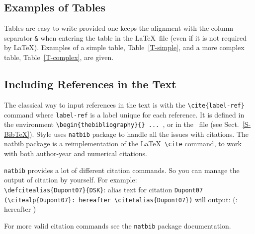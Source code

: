\documentclass[namedreferences,hyperref,optionalrh,solaromanenum]{spr-sola}
\begin{document}
\subsection{Examples of Tables} %
\label{S-tables}
   Tables are easy to write provided one keeps the alignment 
with the column separator \texttt{\&} when entering the table 
in the \LaTeX\ file 
(even if it is not required by \LaTeX). Examples of a simple table,
Table~\ref{T-simple}, and a more complex table, Table~\ref{T-complex},
are given.

\subsection{Including References in the Text} %
\label{S-references}
The classical way to input references in the text is with the 
\verb+\cite{label-ref}+ command where \verb+label-ref+ is a label
unique for each reference.  It is defined in the environment
\verb+\begin{thebibliography}{} ... +, or in the \BibTeX\ file
(see Sect.~\ref{S-BibTeX}). 
Style uses \texttt{natbib} package to handle all the issues with citations.
The natbib package is a reimplementation of the \LaTeX\ \verb+\cite+ command, 
to work with both author-year and numerical citations.

\texttt{natbib} provides a lot of different citation commands. So you can manage the output of citation by yourself.
For example:\\
\verb+\defcitealias{Dupont07}{DSK}+: alias text for citation \texttt{Dupont07}\\
\verb+(\citealp{Dupont07}: hereafter \citetalias{Dupont07})+ will output:\linebreak 
                                  (\citealp{Dupont07}: hereafter )

For more valid citation commands see the \texttt{natbib} package documentation.

                                  
\end{document}
